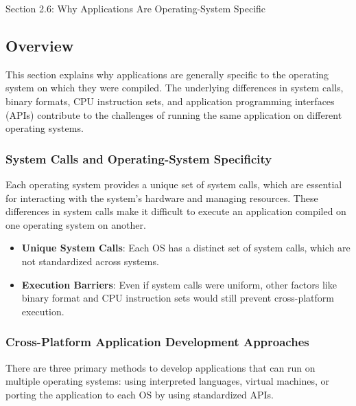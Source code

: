 \begin{notes}{Section 2.6: Why Applications Are Operating-System Specific}
    \subsection*{Overview}

    This section explains why applications are generally specific to the operating system on which they were compiled. The underlying differences in system calls, binary formats, CPU instruction sets, 
    and application programming interfaces (APIs) contribute to the challenges of running the same application on different operating systems.
    
    \subsubsection*{System Calls and Operating-System Specificity}
    
    Each operating system provides a unique set of system calls, which are essential for interacting with the system's hardware and managing resources. These differences in system calls make it difficult 
    to execute an application compiled on one operating system on another.
    
    \begin{highlight}
    
    \begin{itemize}
        \item \textbf{Unique System Calls}: Each OS has a distinct set of system calls, which are not standardized across systems.
        \item \textbf{Execution Barriers}: Even if system calls were uniform, other factors like binary format and CPU instruction sets would still prevent cross-platform execution.
    \end{itemize}
    
    \end{highlight}
    
    \subsubsection*{Cross-Platform Application Development Approaches}
    
    There are three primary methods to develop applications that can run on multiple operating systems: using interpreted languages, virtual machines, or porting the application to each OS by using standardized APIs.
    

\end{notes}
